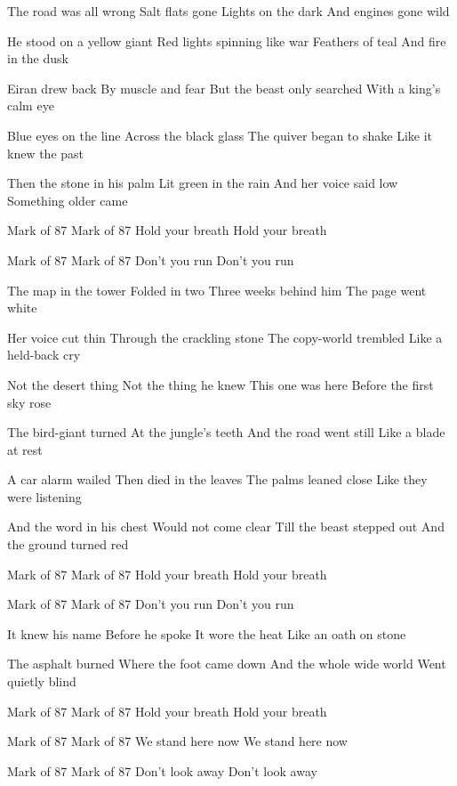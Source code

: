 \begin{lyrics}
The road was all wrong
Salt flats gone
Lights on the dark
And engines gone wild

He stood on a yellow giant
Red lights spinning like war
Feathers of teal
And fire in the dusk

Eiran drew back
By muscle and fear
But the beast only searched
With a king’s calm eye

Blue eyes on the line
Across the black glass
The quiver began to shake
Like it knew the past

Then the stone in his palm
Lit green in the rain
And her voice said low
Something older came

Mark of 87
Mark of 87
Hold your breath
Hold your breath

Mark of 87
Mark of 87
Don’t you run
Don’t you run

The map in the tower
Folded in two
Three weeks behind him
The page went white

Her voice cut thin
Through the crackling stone
The copy-world trembled
Like a held-back cry

Not the desert thing
Not the thing he knew
This one was here
Before the first sky rose

The bird-giant turned
At the jungle’s teeth
And the road went still
Like a blade at rest

A car alarm wailed
Then died in the leaves
The palms leaned close
Like they were listening

And the word in his chest
Would not come clear
Till the beast stepped out
And the ground turned red

Mark of 87
Mark of 87
Hold your breath
Hold your breath

Mark of 87
Mark of 87
Don’t you run
Don’t you run

It knew his name
Before he spoke
It wore the heat
Like an oath on stone

The asphalt burned
Where the foot came down
And the whole wide world
Went quietly blind

Mark of 87
Mark of 87
Hold your breath
Hold your breath

Mark of 87
Mark of 87
We stand here now
We stand here now

Mark of 87
Mark of 87
Don’t look away
Don’t look away
\end{lyrics}
